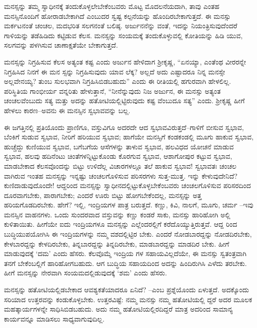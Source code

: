 ಮನಸ್ಸನ್ನು ತಮ್ಮ ಸ್ವಾಧೀನಕ್ಕೆ ತಂದುಕೊಳ್ಳಲೇಬೇಕೆಂಬವರು ಮೊಟ್ಟ ಮೊದಲನೆಯದಾಗಿ, ತಾವು ಎಂತಹ ಮನಸ್ಸಿನೊಂದಿಗೆ ಹೋರಾಡಬೇಕಾಗಿದೆ ಎಂಬುದರ ಸ್ವಷ್ಟ ಕಲ್ಪನೆಯನ್ನು ಹೊಂದಿರಬೇಕಾಗುತ್ತದೆ. ಈ ಮನಸ್ಸು ಮರ್ಕಟನಂತೆ ಚಂಚಲ, ಮದಭರಿತ ಸಲಗನಂತೆ ಬಲಿಷ್ಠ. ಅರ್ಜುನನೆನ್ನು ವಂತೆ, ಇದನ್ನು ನಿಯಂತ್ರಿಸುವುದೆಂದರೆ ಗಾಳಿಯನ್ನು ತಡೆಹಿಡಿದು ಕಟ್ಟಿಡುವ ಕೆಲಸ. ಮನಸ್ಸನ್ನು ಸಂಯಮಕ್ಕೆ ತಂದುಕೊಳ್ಳುವಲ್ಲಿ ಕೋತಿಯನ್ನು ಹಿಡಿ ಯುವ, ಸಲಗವನ್ನು ಪಳಗಿಸುವ ಚಾಣಾಕ್ಷತೆಯೇ ಬೇಕಾಗುತ್ತದೆ.

ಮನಸ್ಸನ್ನು ನಿಗ್ರಹಿಸುವ ಕೆಲಸ ಅತ್ಯಂತ ಕಷ್ಟ ಎಂದು ಅರ್ಜುನ ಹೇಳಿದಾಗ ಶ್ರೀಕೃಷ್ಣ, “ಏನಯ್ಯಾ, ಎಂತೆಂಥ ವೀರರನ್ನೇ ನಿಗ್ರಹಿಸಿದ ನಿನಗೆ ಈ ಮನ ಸ್ಸನ್ನು ನಿಗ್ರಹಿಸುವುದು ಯಾವ ಲೆಕ್ಕ? ಅಲ್ಲದೆ ಅದು ಎಷ್ಟಾದರೂ ನಿನ್ನ ಮನಸ್ಸೇ ಅಲ್ಲವೇನಯ್ಯ? ತುಂಬ ಸುಲಭವಾಗಿ ನಿಗ್ರಹಿಸಿಬಿಡಬಹುದು” ಎಂದು ಈ ರೀತಿಯಲ್ಲಿ ಹಗುರವಾಗಿ ಹೇಳಲಿಲ್ಲ. ಪರಿಸ್ಥಿತಿಯ ಗಾಂಭೀರ್ಯ ವನ್ನರಿತು ಹೇಳುತ್ತಾನೆ, “ನೀನೆನ್ನುವುದು ನಿಜ ಅರ್ಜುನ, ಈ ಮನಸ್ಸು ಅತ್ಯಂತ ಚಂಚಲವೆಂಬುದು ಸತ್ಯ ಮತ್ತು ಅದನ್ನು ಹತೋಟಿಯಲ್ಲಿಟ್ಟಿರುವುದು ಕಷ್ಟ ವೆಂಬುದೂ ಸತ್ಯ” ಎಂದು. ಶ್ರೀಕೃಷ್ಣ ಹೀಗೆ ಹೇಳಲು ಕಾರಣ–ಅವನು ಈ ಮನಸ್ಸಿನ ಸ್ವಭಾವವನ್ನು ಬಲ್ಲ.

ಈ ಜಗತ್ತಿನಲ್ಲಿ ಪ್ರತಿಯೊಂದು ಪ್ರಾಣಿಗೂ, ವಸ್ತುವಿಗೂ ಅದರದೇ ಆದ ಸ್ವಭಾವವಿರುತ್ತದೆ–ಗಾಳಿಗೆ ಬೀಸುವ ಸ್ವಭಾವ, ಬೆಂಕಿಗೆ ಸುಡುವ ಸ್ವಭಾವ, ನೀರಿಗೆ ಹರಿಯುವ ಸ್ವಭಾವ; ಹಾಗೆಯೇ ಮನಸ್ಸಿಗೆ ಕಂಡಕಂಡಲ್ಲಿ ಮೂಗು ಹಾಕುವ ಸ್ವಭಾವ, ಹುಚ್ಚೆದ್ದು ಕುಣಿಯುವ ಸ್ವಭಾವ, ಬಗೆಬಗೆಯ ಆಸೆಗಳನ್ನು ತಾಳುವ ಸ್ವಭಾವ, ಹಲವಿಧದ ಯೋಚನೆ ಮಾಡುವ ಸ್ವಭಾವ, ಹಲವು ಹದಿನೆಂಟು ಚಿಂತೆಗಳನ್ನಿಟ್ಟುಕೊಂಡು ಕೊರಗುವ ಸ್ವಭಾವ, ಆಶಾಗೋಪುರ ಕಟ್ಟುವ ಸ್ವಭಾವ, ಮಾಡಬೇಕಾದ ಕೆಲಸವೊಂದನ್ನು ಬಿಟ್ಟು ಉಳಿದೆಲ್ಲ ವಿಚಾರಗಳಲ್ಲೂ ತಲೆ ಹಾಕುವ ಸ್ವಭಾವ! ಸ್ವಭಾವತಃ ಚಂಚಲ ವಾಗಿರುವ ಇಂತಹ ಮನಸ್ಸನ್ನು ಇನ್ನಷ್ಟು ಚಂಚಲಗೊಳಿಸುವ ಪರಿಸರಗಳು ಸುತ್ತ-ಮುತ್ತ. ಇನ್ನು ಕೇಳುವುದೇನಿದೆ? ಕುಣಿದಾಡುವುದೊಂದೇ! ಆದ್ದರಿಂದ ಮನಸ್ಸನ್ನು ಸ್ವಾಧೀನದಲ್ಲಿಟ್ಟುಕೊಳ್ಳಬೇಕೆಂಬವರು ಚಂಚಲಗೊಳಿಸುವ ಪರಿಸರದಿಂದ ದೂರವಾಗಬೇಕು, ಪಾರಾಗಬೇಕು; ಎಂದರೆ ಊರು ಬಿಟ್ಟು ಹೋಗಬೇಕೆಂದಲ್ಲ, ಮನಸ್ಸನ್ನು ಅತ್ತ ಹರಿಯಗೊಡದಿರಬೇಕು. ಹೇಗೆ? ಇಲ್ಲಿ, ಇಂದ್ರಿಯಗಳ ಪಾತ್ರ ಬರುತ್ತದೆ. ಕಣ್ಣು, ಕಿವಿ, ನಾಲಗೆ, ಮೂಗು, ಚರ್ಮ –ಇವು ಮನಸ್ಸಿನ ವಾಹನಗಳು. ಒಂದು ಸುಂದರವಾದ ವಸ್ತುವನ್ನು ಕಣ್ಣು ಕಂಡರೆ ಸಾಕು, ಮನಸ್ಸು ಹಾರಿಹೋಗಿ ಅಲ್ಲಿ ಕುಳಿತಾಯಿತು. ಹೀಗೆಯೇ ಐದು ಇಂದ್ರಿಯಗಳೂ ಮನಸ್ಸನ್ನು ಎಲ್ಲೆಂದರಲ್ಲಿಗೆ ಕರೆದೊಯ್ಯುತ್ತಿರುತ್ತವೆ. ಆದ್ದ ರಿಂದ ಬುದ್ಧಿಯುಪಯೋಗಿಸಿ ಈ ಇಂದ್ರಿಯಗಳನ್ನು ನಮ್ಮ ವಶದಲ್ಲಿಟ್ಟಿರ ಬೇಕು. ಎಂದರೆ ನೋಡಬಾರದ್ದನ್ನು ನೋಡದಿರಬೇಕು, ಕೇಳಬಾರದ್ದನ್ನು ಕೇಳದಿರಬೇಕು, ತಿನ್ನಬಾರದ್ದನ್ನು ತಿನ್ನದಿರಬೇಕು, ಮಾಡಬಾರದ್ದನ್ನು ಮಾಡದಿರ ಬೇಕು. ಹೀಗೆ ಮಾಡುವುದಕ್ಕೆ ‘ದಮ’ ಎಂದು ಹೆಸರು. ಕೆಲವೊಮ್ಮೆ ಇಂದ್ರಿಯ ಗಳ ಸಹಾಯವಿಲ್ಲದೆಯೇ, ಈ ಮನಸ್ಸು ಸ್ವತಂತ್ರವಾಗಿ ತನಗೆ ಬೇಕೆಂಬಲ್ಲಿಗೆ ಹಾರಿಹೋಗಬಹುದು. ಆಗ ಬುದ್ಧಿಯ ಸಹಾಯದಿಂದ ಅದನ್ನು ಹಿಂದಿರುಗಿಸಿ ಎಳೆದು ತರಬೇಕು. ಹೀಗೆ ಮನಸ್ಸನ್ನು ನೇರವಾಗಿ ಸಂಯಮದಲ್ಲಿಡುವುದಕ್ಕೆ ‘ಶಮ’ ಎಂದು ಹೆಸರು.

ಮನಸ್ಸನ್ನು ಹತೋಟಿಯಲ್ಲಿಡಬೇಕಾದ ಆವಶ್ಯಕತೆಯಾದರೂ ಏನಿದೆ? –ಎಂಬ ಪ್ರಶ್ನೆಯೊಂದು ಏಳುತ್ತದೆ. ಅದಕ್ಕೊಂದು ಸರಿಯಾದ ಉತ್ತರವನ್ನು ಕಂಡುಕೊಳ್ಳಬೇಕು. ಉತ್ತರವಿಷ್ಟೆ: ನಮ್ಮ ಮನಸ್ಸು ನಮ್ಮ ಹತೋಟಿಯಲ್ಲಿ ದ್ದರೆ ಅದರ ಮೂಲಕ ಮಹತ್ಕಾರ್ಯಗಳನ್ನೇ ಸಾಧಿಸಿಬಿಡಬಹುದು. ಅದು ನಮ್ಮ ಹತೋಟಿಯಲ್ಲಿರದಿದ್ದರೆ ಮಾತ್ರ ಅದರಿಂದ ಸಾಮಾನ್ಯ ಕಾರ್ಯವನ್ನೂ ಮಾಡಿಸಲು ಸಾಧ್ಯವಾಗುವುದಿಲ್ಲ.

